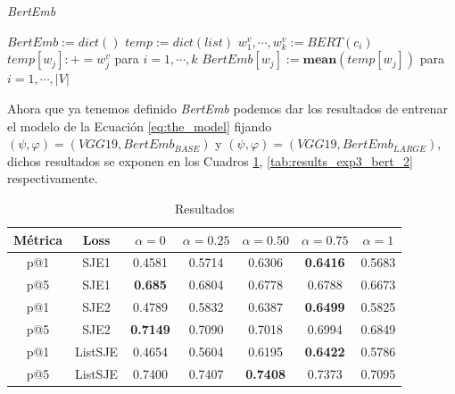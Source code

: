 \begin{algorithm}
\caption{\textit{BertEmb}}
\begin{algorithmic}[1]
\label{algo:bert_emb}
\STATE $BertEmb := dict()$
\STATE $temp := dict(list)$
            \STATE $w_{1}^{v}, \cdots, w_{k}^{v} := \textit{BERT}(c_{i})$
            \STATE $temp[w_{j}] :+= w_{j}^{v}$ para $i=1, \cdots, k$
        \ENDFOR
    \ENDFOR
\ENDFOR
\STATE $BertEmb[w_{j}] := \textbf{mean}(temp[w_{j}])$ para $i=1, \cdots, |V|$ 
\end{algorithmic}
\end{algorithm}

Ahora que ya tenemos definido \textit{BertEmb} podemos dar los resultados de entrenar el modelo de la Ecuación \ref{eq:the_model} fijando  $(\psi, \varphi) = (VGG19, BertEmb_{BASE})$ y $(\psi, \varphi) = (VGG19, BertEmb_{LARGE})$, dichos resultados se exponen en los Cuadros \ref{tab:results_exp3_bert_1}, \ref{tab:results_exp3_bert_2} respectivamente.

\begin{table}[ht]
    \centering
    \begin{tabular}{|c|c|c|c|c|c|c|}
        \hline
        \textbf{Métrica} &
        \textbf{Loss} &
        \textbf{$\alpha = 0$} &
        \textbf{$\alpha = 0.25$} &
        \textbf{$\alpha = 0.50$} &
        \textbf{$\alpha = 0.75$} &
        \textbf{$\alpha = 1$}\\
        \hline \hline
        p@1 & SJE1 & 0.4581 & 0.5714 & 0.6306 & \textbf{0.6416} & 0.5683 \\
        p@5 & SJE1 & \textbf{0.685} & 0.6804 & 0.6778 & 0.6788 & 0.6673 \\
        p@1 & SJE2 & 0.4789 & 0.5832 & 0.6387 & \textbf{0.6499} & 0.5825 \\
        p@5 & SJE2 & \textbf{0.7149} & 0.7090 & 0.7018 & 0.6994 & 0.6849 \\
        p@1 & ListSJE & 0.4654 & 0.5604 & 0.6195 & \textbf{0.6422} & 0.5786 \\
        p@5 & ListSJE & 0.7400 & 0.7407 & \textbf{0.7408} & 0.7373 & 0.7095\\
        \hline
    \end{tabular}
    \caption{Resultados}
    \label{tab:results_exp3_bert_1}
\end{table}

